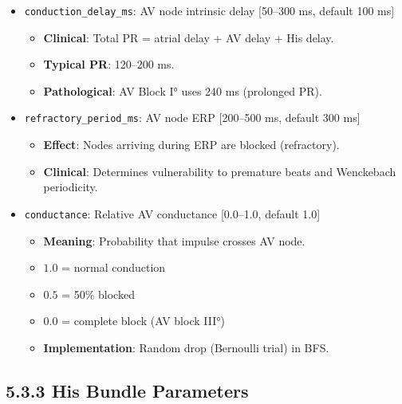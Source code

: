 \documentclass[12pt,oneside,a4paper]{book}
\newcommand{\code}[1]{\texttt{#1}}
\begin{document}
\begin{itemize}
  \item \code{conduction\_delay\_ms}: AV node intrinsic delay [50--300 ms, default 100 ms]
    \begin{itemize}
      \item \textbf{Clinical}: Total PR = atrial delay + AV delay + His delay.
      \item \textbf{Typical PR}: 120--200 ms.
      \item \textbf{Pathological}: AV Block I° uses 240 ms (prolonged PR).
    \end{itemize}

  \item \code{refractory\_period\_ms}: AV node ERP [200--500 ms, default 300 ms]
    \begin{itemize}
      \item \textbf{Effect}: Nodes arriving during ERP are blocked (refractory).
      \item \textbf{Clinical}: Determines vulnerability to premature beats and Wenckebach periodicity.
    \end{itemize}

  \item \code{conductance}: Relative AV conductance [0.0--1.0, default 1.0]
    \begin{itemize}
      \item \textbf{Meaning}: Probability that impulse crosses AV node.
      \item $1.0$ = normal conduction
      \item $0.5$ = 50\% blocked
      \item $0.0$ = complete block (AV block III°)
      \item \textbf{Implementation}: Random drop (Bernoulli trial) in BFS.
    \end{itemize}
\end{itemize}

\subsection{5.3.3 His Bundle Parameters}
\end{document}
